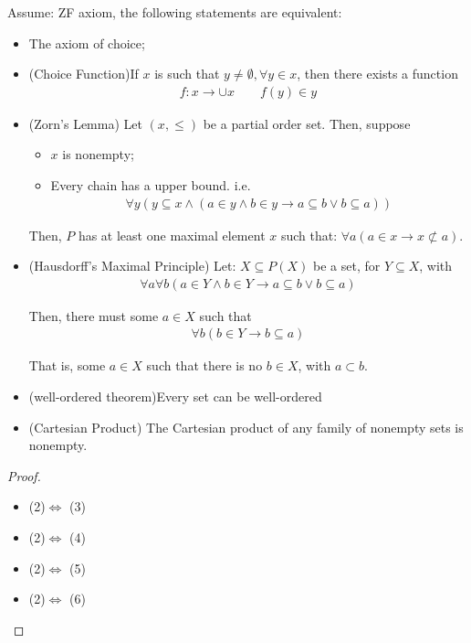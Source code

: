 \documentclass[Total.tex]{subfiles}
\begin{document}
			\begin{proposition}
				Assume: ZF axiom, the following statements are equivalent:
				\begin{itemize}
					\item The axiom of choice;
					\item (Choice Function)If $x$ is such that $y\not=\emptyset,\forall y\in x$, then there exists a function
					\begin{gather*}
						f:x\rightarrow \cup x\qquad f(y)\in y
					\end{gather*}
					\item (Zorn's Lemma) Let $(x,\leq)$ be a partial order set. Then, suppose
					\begin{itemize}
						\item $x$ is nonempty;
						\item Every chain has a upper bound. i.e. 
						\begin{gather*}
							\forall y(y\subseteq x\wedge (a\in y\wedge b\in y\rightarrow a\subseteq b\vee b\subseteq a))
						\end{gather*}
					\end{itemize}
					
					Then, $P$ has at least one maximal element $x$ such that: $\forall a(a\in x\rightarrow x\not\subset a)$. 
					\item (Hausdorff's Maximal Principle) Let: $X\subseteq P(X)$ be a set, for $Y\subseteq X$, with 
					\begin{gather*}
						\forall a\forall b(a\in Y\wedge b\in Y\rightarrow a\subseteq b\vee b\subseteq a)
					\end{gather*}
					
					Then, there must some $a\in X$ such that
					\begin{gather*}
						\forall b(b\in Y\rightarrow b\subseteq a)
					\end{gather*}
					
					That is, some $a\in X$ such that there is no $b\in X$, with $a\subset b$. 
					\item (well-ordered theorem)Every set can be well-ordered
					
					\item (Cartesian Product) The Cartesian product of any family of nonempty sets is nonempty. 
				\end{itemize}
			\end{proposition}
			\begin{proof}
				\begin{itemize}
					\item (2)$\Leftrightarrow$ (3)
					\item (2)$\Leftrightarrow$ (4)
					\item (2)$\Leftrightarrow$ (5)
					\item (2)$\Leftrightarrow$ (6)
				\end{itemize}
			\end{proof}
\end{document}
